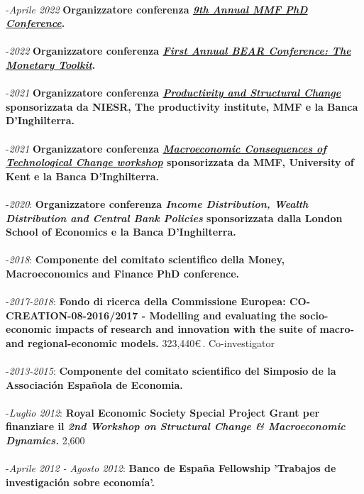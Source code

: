 \documentclass[10p]{article}
\begin{document}
\\
-\emph{Aprile 2022} {\bf Organizzatore conferenza \emph{\href{https://www.mmf.ac.uk/phd/2022-phd-conference/}{9th Annual MMF PhD Conference}}.}\\
\\
-\emph{2022} {\bf Organizzatore conferenza \emph{\href{https://www.bankofengland.co.uk/events/2022/february/first-annual-bear-conference}{First Annual BEAR Conference: The Monetary Toolkit}}.}\\
\\
-\emph{2021} {\bf Organizzatore conferenza \emph{\href{https://www.mmf.ac.uk/productivity-workshop/}{Productivity and Structural Change}} sponsorizzata da NIESR, The productivity institute, MMF e la Banca D'Inghilterra.}\\
\\
-\emph{2021} {\bf Organizzatore conferenza  \emph{\href{https://www.bankofengland.co.uk/events/2021/may/mmf-workshop-on-macroeconomic-consequences-of-technological-change}{Macroeconomic Consequences of Technological Change workshop}} sponsorizzata da MMF, University of Kent e la Banca D'Inghilterra.}\\
\\
-\emph{2020}: {\bf Organizzatore conferenza \emph{Income Distribution, Wealth Distribution and Central Bank Policies} sponsorizzata dalla London School of Economics e la Banca D'Inghilterra.}\\
\\
-\emph{2018}: {\bf Componente del comitato scientifico della Money, Macroeconomics and Finance PhD conference.}\\
\\
-\emph{2017-2018}: {\bf Fondo di ricerca della Commissione Europea: CO-CREATION-08-2016/2017 -  Modelling and evaluating the socio-economic impacts of research and innovation with the suite of macro- and regional-economic models.} 323,440\euro$\,$. Co-investigator \\
\\
-\emph{2013-2015}: {\bf Componente del comitato scientifico del Simposio de la Associaci\'on Española de Economia.}\\
\\
-\emph{Luglio 2012}: {\bf Royal Economic Society Special Project Grant per finanziare il \emph{2nd Workshop on Structural Change \& Macroeconomic Dynamics.}} 2,600\textsterling\\
\\
-\emph{Aprile 2012 - Agosto 2012}: {\bf Banco de Espa\~{n}a Fellowship 'Trabajos de investigaci\'{o}n sobre econom\'{i}a'.}\\
\end{document}

